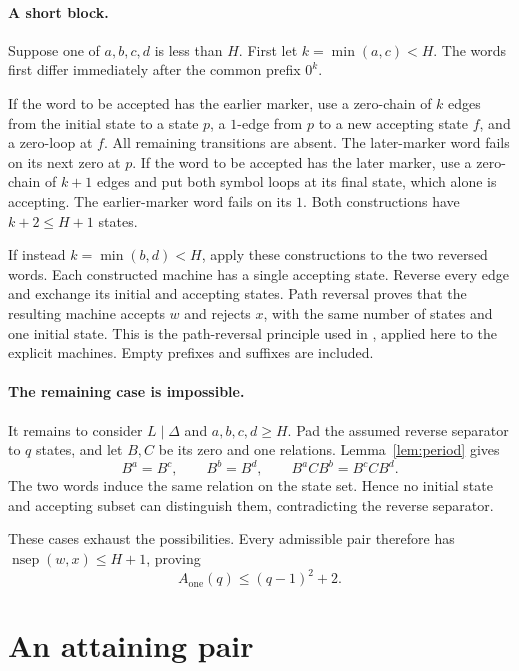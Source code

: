 \documentclass[11pt,a4paper]{article}
\DeclareMathOperator{\nsep}{nsep}
\newcommand{\Aone}{A_{\mathrm{one}}}
\begin{document}
\paragraph{A short block.}
Suppose one of \(a,b,c,d\) is less than \(H\). First let
\(k=\min(a,c)<H\). The words first differ immediately after the common
prefix \(0^k\).

If the word to be accepted has the earlier marker, use a zero-chain
of \(k\) edges from the initial state to a state \(p\), a \(1\)-edge
from \(p\) to a new accepting state \(f\), and a zero-loop at \(f\).
All remaining transitions are absent. The later-marker word fails
on its next zero at \(p\).
If the word to be accepted has the later marker, use a zero-chain
of \(k+1\) edges and put both symbol loops at its final state, which
alone is accepting. The earlier-marker word fails on its \(1\).
Both constructions have \(k+2\leq H+1\) states.

If instead \(k=\min(b,d)<H\), apply these constructions to the two
reversed words. Each constructed machine has a single accepting state.
Reverse every edge and exchange its initial and accepting states.
Path reversal proves that the resulting machine accepts \(w\) and
rejects \(x\), with the same number of states and one initial state.
This is the path-reversal principle used in
\cite[Theorem~5]{demaine2011}, applied here to the explicit machines.
Empty prefixes and suffixes are included.

\paragraph{The remaining case is impossible.}
It remains to consider \(L\mid\Delta\) and \(a,b,c,d\geq H\).
Pad the assumed reverse separator to \(q\) states, and let \(B,C\)
be its zero and one relations. Lemma~\ref{lem:period} gives
\[
 B^a=B^c,\qquad B^b=B^d,\qquad
 B^aCB^b=B^cCB^d.
\]
The two words induce the same relation on the state set. Hence no
initial state and accepting subset can distinguish them, contradicting
the reverse separator.

These cases exhaust the possibilities. Every admissible pair therefore
has \(\nsep(w,x)\leq H+1\), proving
\begin{equation}\label{eq:upper}
 \Aone(q)\leq(q-1)^2+2.
\end{equation}

\section{An attaining pair}
\end{document}
